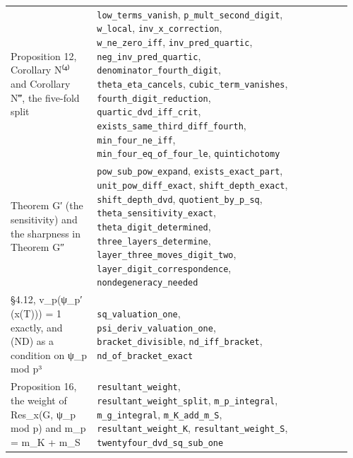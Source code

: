 \documentclass[11pt,a4paper]{article}
\theoremstyle{named}
\begin{document}
\begin{small}
\begin{longtable}{>{\raggedright\arraybackslash}p{0.242\linewidth}>{\raggedright\arraybackslash}p{0.574\linewidth}>{\raggedright\arraybackslash}p{0.143\linewidth}}
Proposition 12, Corollary N⁽⁴⁾ and Corollary N‴, the five-fold split & \texttt{low\_\allowbreak{}terms\_\allowbreak{}vanish}, \texttt{p\_\allowbreak{}mult\_\allowbreak{}second\_\allowbreak{}digit}, \texttt{w\_\allowbreak{}local}, \texttt{inv\_\allowbreak{}x\_\allowbreak{}correction}, \texttt{w\_\allowbreak{}ne\_\allowbreak{}zero\_\allowbreak{}iff}, \texttt{inv\_\allowbreak{}pred\_\allowbreak{}quartic}, \texttt{neg\_\allowbreak{}inv\_\allowbreak{}pred\_\allowbreak{}quartic}, \texttt{denominator\_\allowbreak{}fourth\_\allowbreak{}digit}, \texttt{theta\_\allowbreak{}eta\_\allowbreak{}cancels}, \texttt{cubic\_\allowbreak{}term\_\allowbreak{}vanishes}, \texttt{fourth\_\allowbreak{}digit\_\allowbreak{}reduction}, \texttt{quartic\_\allowbreak{}dvd\_\allowbreak{}iff\_\allowbreak{}crit}, \texttt{exists\_\allowbreak{}same\_\allowbreak{}third\_\allowbreak{}diff\_\allowbreak{}fourth}, \texttt{min\_\allowbreak{}four\_\allowbreak{}ne\_\allowbreak{}iff}, \texttt{min\_\allowbreak{}four\_\allowbreak{}eq\_\allowbreak{}of\_\allowbreak{}four\_\allowbreak{}le}, \texttt{quintichotomy} & 16 \\
Theorem G′ (the sensitivity) and the sharpness in Theorem G″ & \texttt{pow\_\allowbreak{}sub\_\allowbreak{}pow\_\allowbreak{}expand}, \texttt{exists\_\allowbreak{}exact\_\allowbreak{}part}, \texttt{unit\_\allowbreak{}pow\_\allowbreak{}diff\_\allowbreak{}exact}, \texttt{shift\_\allowbreak{}depth\_\allowbreak{}exact}, \texttt{shift\_\allowbreak{}depth\_\allowbreak{}dvd}, \texttt{quotient\_\allowbreak{}by\_\allowbreak{}p\_\allowbreak{}sq}, \texttt{theta\_\allowbreak{}sensitivity\_\allowbreak{}exact}, \texttt{theta\_\allowbreak{}digit\_\allowbreak{}determined}, \texttt{three\_\allowbreak{}layers\_\allowbreak{}determine}, \texttt{layer\_\allowbreak{}three\_\allowbreak{}moves\_\allowbreak{}digit\_\allowbreak{}two}, \texttt{layer\_\allowbreak{}digit\_\allowbreak{}correspondence}, \texttt{nondegeneracy\_\allowbreak{}needed} & 17 \\
§4.12, v\_p(ψ\_p′(x(T))) = 1 exactly, and (ND) as a condition on ψ\_p mod p³ & \texttt{sq\_\allowbreak{}valuation\_\allowbreak{}one}, \texttt{psi\_\allowbreak{}deriv\_\allowbreak{}valuation\_\allowbreak{}one}, \texttt{bracket\_\allowbreak{}divisible}, \texttt{nd\_\allowbreak{}iff\_\allowbreak{}bracket}, \texttt{nd\_\allowbreak{}of\_\allowbreak{}bracket\_\allowbreak{}exact} & 18 \\
Proposition 16, the weight of Res\_x(G, ψ\_p mod p) and m\_p = m\_K + m\_S & \texttt{resultant\_\allowbreak{}weight}, \texttt{resultant\_\allowbreak{}weight\_\allowbreak{}split}, \texttt{m\_\allowbreak{}p\_\allowbreak{}integral}, \texttt{m\_\allowbreak{}g\_\allowbreak{}integral}, \texttt{m\_\allowbreak{}K\_\allowbreak{}add\_\allowbreak{}m\_\allowbreak{}S}, \texttt{resultant\_\allowbreak{}weight\_\allowbreak{}K}, \texttt{resultant\_\allowbreak{}weight\_\allowbreak{}S}, \texttt{twentyfour\_\allowbreak{}dvd\_\allowbreak{}sq\_\allowbreak{}sub\_\allowbreak{}one} & 18 \\

\end{longtable}
\end{small}
\end{document}
